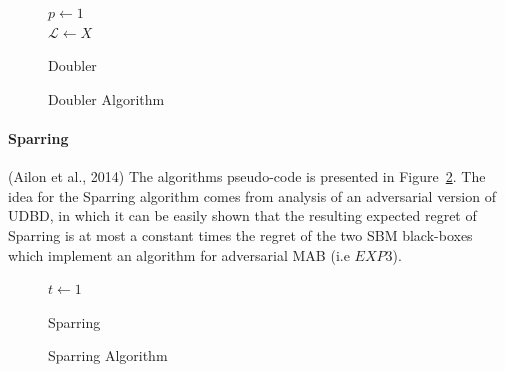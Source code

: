 \documentclass{llncs}
\begin{document}
	\begin{figure}[h]
	\IncMargin{1em}
		\begin{algorithm}[H]
		
		\BlankLine
		$p\leftarrow 1$\\
		$ \mathcal{L} \leftarrow X$\\
			\caption{Doubler}
		\end{algorithm}
		\caption{Doubler Algorithm}\label{algo_Doubler}
	\end{figure}

\paragraph{Sparring}
	(Ailon et al., 2014) The algorithms pseudo-code is presented in Figure~\ref{algo_Sparring}.
	The idea for the Sparring algorithm comes from analysis of an adversarial version of UDBD, in which it can be easily shown that the resulting expected regret of Sparring is at most a constant times the regret of the two SBM black-boxes which implement an algorithm for adversarial MAB (i.e $EXP3$).
		
		\begin{figure}[h]
	\IncMargin{1em}
		\begin{algorithm}[H]
		\BlankLine
		$t\leftarrow 1$\\
			\caption{Sparring}
		\end{algorithm}
		\caption{Sparring Algorithm}\label{algo_Sparring}
	\end{figure}	
	
\end{document}
